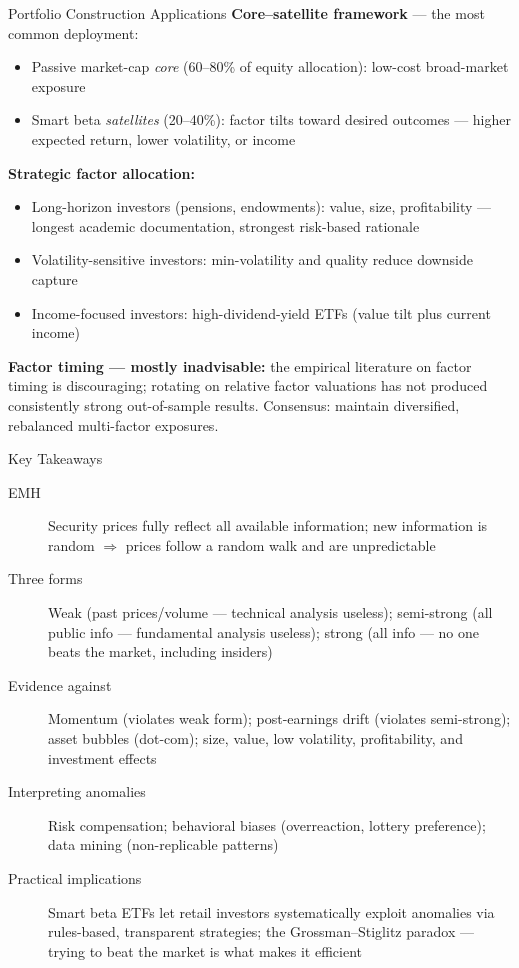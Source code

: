 \documentclass[aspectratio=169]{beamer}
\begin{document}
\begin{frame}{Portfolio Construction Applications}
\textbf{Core--satellite framework} --- the most common deployment:
\begin{itemize}
  \item Passive market-cap \emph{core} (60--80\% of equity allocation): low-cost broad-market exposure
  \item Smart beta \emph{satellites} (20--40\%): factor tilts toward desired outcomes --- higher expected return, lower volatility, or income
\end{itemize}
\vspace{0.3em}
\textbf{Strategic factor allocation:}
\begin{itemize}
  \item Long-horizon investors (pensions, endowments): value, size, profitability --- longest academic documentation, strongest risk-based rationale
  \item Volatility-sensitive investors: min-volatility and quality reduce downside capture
  \item Income-focused investors: high-dividend-yield ETFs (value tilt plus current income)
\end{itemize}
\vspace{0.3em}
\textbf{Factor timing --- mostly inadvisable:} the empirical literature on factor timing is discouraging; rotating on relative factor valuations has not produced consistently strong out-of-sample results. Consensus: maintain diversified, rebalanced multi-factor exposures.
\end{frame}


\begin{frame}{Key Takeaways}
\begin{description}
  \item[EMH] Security prices fully reflect all available information; new information is random $\Rightarrow$ prices follow a random walk and are unpredictable
  \item[Three forms] Weak (past prices/volume --- technical analysis useless); semi-strong (all public info --- fundamental analysis useless); strong (all info --- no one beats the market, including insiders)
  \item[Evidence against] Momentum (violates weak form); post-earnings drift (violates semi-strong); asset bubbles (dot-com); size, value, low volatility, profitability, and investment effects
  \item[Interpreting anomalies] Risk compensation; behavioral biases (overreaction, lottery preference); data mining (non-replicable patterns)
  \item[Practical implications] Smart beta ETFs let retail investors systematically exploit anomalies via rules-based, transparent strategies; the Grossman--Stiglitz paradox --- trying to beat the market is what makes it efficient
\end{description}
\end{frame}
\end{document}
